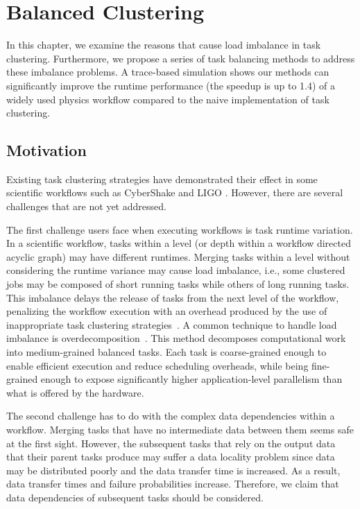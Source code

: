 \chapter{Balanced Clustering} 

In this chapter, we examine the reasons that cause load imbalance in task clustering. Furthermore, we propose a series of task balancing methods to address these imbalance problems. A trace-based simulation shows our methods can significantly improve the runtime performance (the speedup is up to 1.4) of a widely used physics workflow compared to the naive implementation of task clustering.

\section{Motivation}


Existing task clustering strategies have demonstrated their effect in some scientific workflows such as CyberShake \cite{Rynge2012} and LIGO \cite{Deelman2002}. However, there are several challenges that are not yet addressed. 

The first challenge users face when executing workflows is task runtime variation. 
In a scientific workflow, tasks within a level (or depth within a workflow directed acyclic graph) may have different runtimes. Merging tasks within a level without considering the runtime variance may cause load imbalance, i.e., some clustered jobs may be composed of short running tasks while others of long running tasks. This imbalance delays the release of tasks from the next level of the workflow, penalizing the workflow execution with an overhead produced by the use of inappropriate task clustering strategies~\cite{Chen2013}.
A common technique to handle load imbalance is overdecomposition~\cite{Lifflander2012}.
This method decomposes computational work into medium-grained balanced tasks. Each task is coarse-grained enough to enable efficient execution and reduce scheduling overheads, while being fine-grained enough to expose significantly higher application-level parallelism than what is offered by the hardware. 

The second challenge has to do with the complex data dependencies within a workflow. 
Merging tasks that have no intermediate data between them seems safe at the first sight. However, the subsequent tasks that rely on the output data that their parent tasks produce may suffer a data locality problem since data may be distributed poorly and the data transfer time is increased.  As a result, data transfer times and failure probabilities increase. Therefore, we claim that data dependencies of subsequent tasks should be considered.


